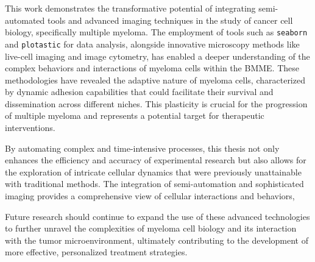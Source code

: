 

%
\label{sec:discussion_overall_conclusion}%






This work demonstrates the transformative potential of integrating
semi-automated tools and advanced imaging techniques in the study of cancer cell
biology, specifically multiple myeloma. The employment of tools such as
\texttt{seaborn} and \texttt{plotastic} for data analysis, alongside innovative
microscopy methods like live-cell imaging and image cytometry, has enabled a
deeper understanding of the complex behaviors and interactions of myeloma cells
within the \acf{BMME}. These methodologies have revealed the adaptive nature of
myeloma cells, characterized by dynamic adhesion capabilities that could
facilitate their survival and dissemination across different niches. This
plasticity is crucial for the progression of multiple myeloma and represents a
potential target for therapeutic interventions.

By automating complex and time-intensive processes, this thesis not only
enhances the efficiency and accuracy of experimental research but also allows
for the exploration of intricate cellular dynamics that were previously
unattainable with traditional methods. The integration of semi-automation and
sophisticated imaging provides a comprehensive view of cellular interactions and
behaviors,

Future research should continue
to expand the use of these advanced technologies to further unravel the
complexities of myeloma cell biology and its interaction with the tumor
microenvironment, ultimately contributing to the development of more effective,
personalized treatment strategies.

